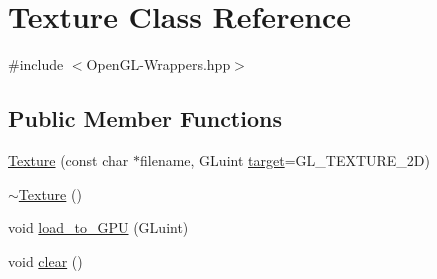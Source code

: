 \hypertarget{classTexture}{}\section{Texture Class Reference}
\label{classTexture}


{\ttfamily \#include $<$Open\+G\+L-\/\+Wrappers.\+hpp$>$}

\subsection*{Public Member Functions}
\begin{DoxyCompactItemize}
\item 
\mbox{\hyperlink{classTexture_aa063ccdd7622f00e20e1646ce3ef6dce}{Texture}} (const char $\ast$filename, G\+Luint \mbox{\hyperlink{classTexture_adc0777da3ba92545967d6cf9b8d14926}{target}}=G\+L\+\_\+\+T\+E\+X\+T\+U\+R\+E\+\_\+2D)
\item 
\mbox{\hyperlink{classTexture_a09c4bcb7462f64c1d20fa69dba3cee8a}{$\sim$\+Texture}} ()
\item 
void \mbox{\hyperlink{classTexture_a9db65830c1a20ad231183c498f711337}{load\+\_\+to\+\_\+\+G\+PU}} (G\+Luint)
\item 
void \mbox{\hyperlink{classTexture_ae02304cd1a555cd43b0af49162102a1a}{clear}} ()
\end{DoxyCompactItemize}
